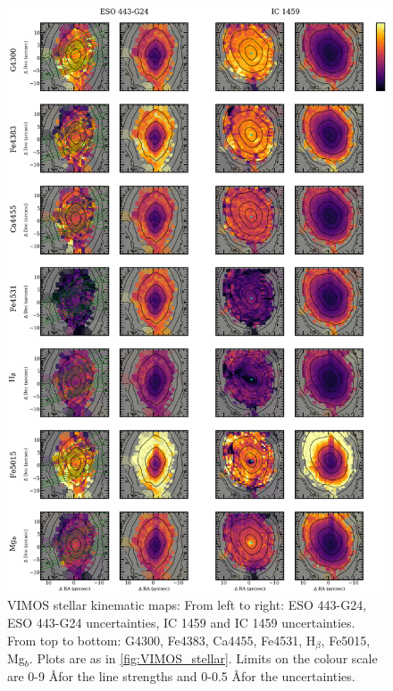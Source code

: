 		\begin{figure}
			\centering
			\includegraphics[height=0.94\textheight]{chapter4/vimos/abs1.png}
			\caption[VIMOS absorption line strength maps]{VIMOS stellar kinematic maps: From left to right: ESO 443-G24, ESO 443-G24 uncertainties, IC 1459 and IC 1459 uncertainties. From top to bottom: G4300, Fe4383, Ca4455, Fe4531, H$_\beta$, Fe5015, Mg$_b$. Plots are as in \ref{fig:VIMOS_stellar}. Limits on the colour scale are 0-9 \AA  for the line strengths and 0-0.5 \AA  for the uncertainties.}
			\label{fig:VIMOS_absorption}
		\end{figure}

